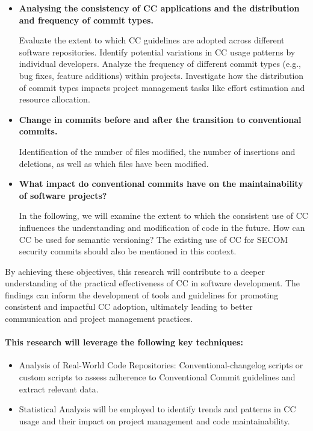 \documentclass[11pt]{article}
\begin{document}
\begin{itemize}
\item \textbf{Analysing the consistency of CC applications and the distribution and frequency of commit types.}

    Evaluate the extent to which CC guidelines are adopted across different software repositories.
    Identify potential variations in CC usage patterns by individual developers. Analyze the frequency of different commit types (e.g., bug fixes, feature additions) within projects. Investigate how the distribution of commit types impacts project management tasks like effort estimation and resource allocation.

 \item \textbf{Change in commits before and after the transition to conventional commits.}

    Identification of the number of files modified, the number of insertions and deletions, as well as which files have been modified.

\item \textbf{What impact do conventional commits have on the maintainability of software projects?}

    In the following, we will examine the extent to which the consistent use of CC influences the understanding and modification of code in the future. How can CC be used for semantic versioning? The existing use of CC for SECOM security commits should also be mentioned in this context.
\end{itemize}

By achieving these objectives, this research will contribute to a deeper understanding of the practical effectiveness of CC in software development. The findings can inform the development of tools and guidelines for promoting consistent and impactful CC adoption, ultimately leading to better communication and project management practices.

\paragraph {This research will leverage the following key techniques:}

\begin{itemize}
\item Analysis of Real-World Code Repositories: Conventional-changelog scripts or custom scripts to assess adherence to Conventional Commit guidelines and extract relevant data.
\item Statistical Analysis will be employed to identify trends and patterns in CC usage and their impact on project management and code maintainability.
\end{itemize}
\end{document}
